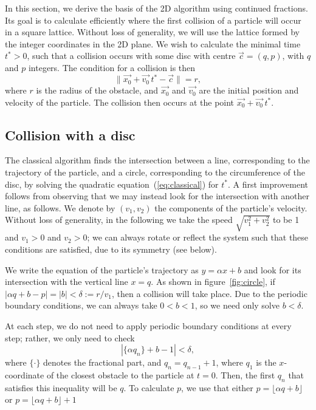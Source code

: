 \documentclass{iopart}
\newcommand{\eqref}[1]{(\ref{#1})}
\begin{document}
In this section, we derive the basis of the 2D algorithm using continued fractions.
Its goal is to calculate efficiently where the first collision of a particle will occur in a square lattice. Without loss of generality, we will use the lattice formed by the integer coordinates in the 2D plane. We wish to calculate the minimal time $t^{\ast}>0$, such that a collision occurs with some disc with centre $\vec{c}=(q,p)$, with $q$ and $p$ integers. The condition for a collision is then 
\begin{equation}
\|\vec{x_0}+\vec{v_0} \, t^{\ast} -  \vec{c} \| = r,
\label{eq:classical}
\end{equation}
where $r$ is the radius of the obstacle, and $\vec{x_0}$ and $\vec{v_0}$ are the initial position and velocity of the particle. The collision then occurs at the point 
$\vec{x_0}+\vec{v_0} \, t^{\ast}$.

\subsection{Collision with a disc}
The classical algorithm finds the intersection between a line, corresponding to the trajectory of 
the particle, and a circle, corresponding to the circumference of the disc, by solving the quadratic equation~\eqref{eq:classical} for $t^{\ast}$. A first improvement follows from observing that we may instead look for the intersection with another line, as follows. We denote by $(v_{1}, v_{2})$ the components of the particle's velocity. Without loss of generality, in the following we take the speed $\sqrt{v_{1}^{2} + v_{2}^{2}}$ to be 1 and $v_1>0$ and $v_2>0$; we can always rotate or reflect the system such that these conditions are satisfied, due to its symmetry (see below).

We write the equation of the particle's trajectory as $y=\alpha x+b$ and look for its intersection with the vertical line $x=q$. As shown in figure~\ref{fig:circle}, if $|\alpha q+b-p| = |b| < \delta := r/v_1$, then a collision will take place. Due to the periodic boundary conditions, we can always take $0 < b < 1$, so we need only solve $b<\delta$. 

At each step, we do not need to apply periodic boundary conditions at every step; rather, we only need to check 
\begin{equation}
|\{ \alpha  q_n \}+b -1|< \delta, 
\label{eq:master}
\end{equation}
where $\{ \cdot \}$ denotes the fractional part, and $q_n=q_{n-1}+1$, where $q_1$ is the $x$-coordinate of the closest obstacle to the particle at $t=0$. Then, the first $q_n$ that satisfies this inequality will be $q$. To calculate $p$, we use that either $p=\lfloor \alpha q +b\rfloor$ or $p=\lfloor \alpha q +b\rfloor+1$
\end{document}
